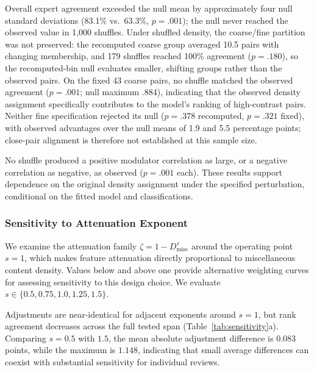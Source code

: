 \documentclass[fleqn,10pt]{JLA_article}
\begin{document}
Overall expert agreement exceeded the null mean by approximately four null standard deviations (83.1\% vs.\ 63.3\%, $p=.001$); the null never reached the observed value in 1{,}000 shuffles. Under shuffled density, the coarse/fine partition was not preserved: the recomputed coarse group averaged 10.5 pairs with changing membership, and 179 shuffles reached 100\% agreement ($p=.180$), so the recomputed-bin null evaluates smaller, shifting groups rather than the observed pairs. On the fixed 43 coarse pairs, no shuffle matched the observed agreement ($p=.001$; null maximum .884), indicating that the observed density assignment specifically contributes to the model's ranking of high-contrast pairs. Neither fine specification rejected its null ($p=.378$ recomputed, $p=.321$ fixed), with observed advantages over the null means of 1.9 and 5.5 percentage points; close-pair alignment is therefore not established at this sample size.

No shuffle produced a positive modulator correlation as large, or a negative correlation as negative, as observed ($p=.001$ each). These results support dependence on the original density assignment under the specified perturbation, conditional on the fitted model and classifications.

\subsubsection{Sensitivity to Attenuation Exponent}

We examine the attenuation family $\zeta = 1 - D_{\text{misc}}^{s}$ around the operating point $s=1$, which makes feature attenuation directly proportional to miscellaneous content density. Values below and above one provide alternative weighting curves for assessing sensitivity to this design choice. We evaluate $s \in \{0.5, 0.75, 1.0, 1.25, 1.5\}$.

Adjustments are near-identical for adjacent exponents around $s=1$, but rank agreement decreases across the full tested span (Table~\ref{tab:sensitivity}a). Comparing $s=0.5$ with $1.5$, the mean absolute adjustment difference is $0.083$ points, while the maximum is $1.148$, indicating that small average differences can coexist with substantial sensitivity for individual reviews.
\end{document}
